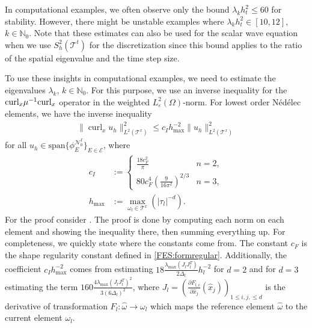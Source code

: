 \documentclass[a4paper,11pt]{article}
\newcommand{\N}{\mathbb N}
\newcommand{\cu}{\operatorname{curl}}
\begin{document}
In computational examples, we often observe only the bound $\lambda_k h_t^2\leq 60$ for stability. However, there might be unstable examples where $\lambda_k h_t^2\in[10,12],$ $k\in \N_0$. Note that these estimates can also be used for the scalar wave equation when we use $S_h^2(\mathcal{T}^t)$ for the discretization since this bound applies to the ratio of the spatial eigenvalue and the time step size.

To use these insights in computational examples, we need to estimate the eigenvalues $\lambda_k$, $k\in\N_0$.  For this purpose, we use an inverse inequality for the $\textmd{curl}_x \mu^{-1}\textmd{curl}_x$ operator in the weighted $L^2_\varepsilon(\Omega)$-norm. 
For  lowest order Nédélec elements, we have the inverse inequality
\begin{align}\label{ieq:InverseInequality}
	\|\cu_x  u_h\|^2_{L^2(\mathcal{T}^x)} \leq c_I h_{\max}^{-2} \|u_h\|^2_{L^2(\mathcal{T}^x)} 
\end{align}
for all $u_h\in \mathrm{span} \{\phi_E^{\mathcal{N}^I_0}\}_{E\in\mathcal{E}}$, where
\begin{align*}
	c_I &:= \begin{cases}
		\frac{18 c_F^2}{\pi} &n=2,\\
		80 c_F^4 (\frac{9}{16\pi^2})^{2/3}&n =3,
	\end{cases}\\
	h_{\max} &:=\max_{\omega_l\in \mathcal{T}^x}( |\tau_l|^{-d} ).
\end{align*}
For the proof consider \cite[Lem.~A.2]{HauserDiss2021}. The proof is done by computing each norm on each element and showing the inequality there, then summing everything up. For completeness, we quickly state where the constants come from. The constant $c_F$ is the shape regularity constant defined in \eqref{FES:formregular}. Additionally, the coefficient $c_I h_{\max}^{-2}$ comes from estimating $18\frac{\lambda_{\max}(J_lJ_l^T)}{2\Delta_l}h_l^{-2}$ for $d=2$ and for $d=3$ estimating the term  $160\frac{4\lambda_{\max}(J_lJ_l^T)^2}{3(6\Delta_l)^2}$, where $J_l = \left(\frac{\partial F_{l,i}}{\partial \hat{x}_j}(\hat{x}_j)\right)_{1\leq i,j,\leq d}$ is the derivative of transformation $F_l : \hat{\omega}\to\omega_l$ which maps the reference element $\hat{\omega}$ to the current element $\omega_l$.
\end{document}
